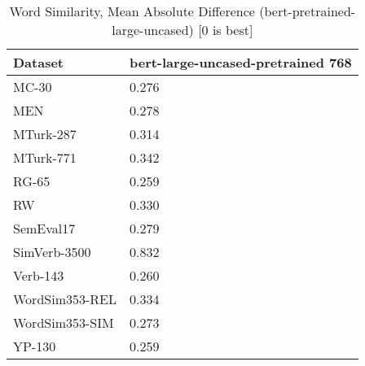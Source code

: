 \begin{table}[]
\centering
\begin{tabular}{l|l}
\hline
Dataset & bert-large-uncased-pretrained 768 \\
\hline
MC-30 & 0.276 \\ 
MEN & 0.278 \\ 
MTurk-287 & 0.314 \\ 
MTurk-771 & 0.342 \\ 
RG-65 & 0.259 \\ 
RW & 0.330 \\ 
SemEval17 & 0.279 \\ 
SimVerb-3500 & 0.832 \\ 
Verb-143 & 0.260 \\ 
WordSim353-REL & 0.334 \\ 
WordSim353-SIM & 0.273 \\ 
YP-130 & 0.259
\end{tabular}
\caption{Word Similarity, Mean Absolute Difference (bert-pretrained-large-uncased) [0 is best]}
\label{tab:similarity-bert-pretrained-large-uncased}
\end{table}
